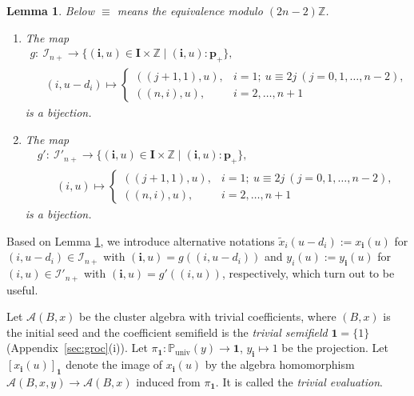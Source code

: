\documentclass[pdftex]{sigma}
\numberwithin{equation}{section}
\newtheorem{Lemma}[Theorem]{Lemma}
\theoremstyle{definition}
\begin{document}
\begin{Lemma}
\label{lem:gmap}
Below $\equiv$ means the equivalence modulo $(2n-2)\mathbb{Z}$.

\begin{enumerate}\itemsep=0pt
\item[$(i)$]
The map
\begin{gather*}
g:  \ \mathcal{I}_{n+} \rightarrow
\{ (\mathbf{i},u)\in \mathbf{I}\times \mathbb{Z} \mid
(\mathbf{i},u): \mathbf{p}_+
\}, \\
\phantom{g: \ } \ (i,u-d_i) \mapsto
\begin{cases}
((j+1,1),u), & i= 1; \
u \equiv 2j
\ (j=0,1,\dots,n-2),\\
((n,i),u), & i=2,\dots,n+1
\end{cases}
\end{gather*}
is a bijection.

\item[$(ii)$]
The map
\begin{gather*}
g': \  \mathcal{I}'_{n+} \rightarrow
\{ (\mathbf{i},u)\in \mathbf{I}\times \mathbb{Z} \mid
 (\mathbf{i},u): \mathbf{p}_+
\}, \\
\phantom{g': \ }{} \  (i,u) \mapsto
\begin{cases}
((j+1,1),u), & i= 1;\
u\equiv 2j
\ (j=0,1,\dots,n-2), \\
((n,i),u), &  i=2,\dots,n+1
\end{cases}
\end{gather*}
is a bijection.
\end{enumerate}
\end{Lemma}

Based on Lemma \ref{lem:gmap},
we introduce alternative notations
$\tilde{x}_i(u-d_i):=x_{\mathbf{i}}(u)$
for $(i,u-d_i)\in \mathcal{I}_{n+}$
with $(\mathbf{i},u)=g((i,u-d_i))$
and
$y_i(u):=y_{\mathbf{i}}(u)$
for $(i,u)\in \mathcal{I}'_{n+}$
with $(\mathbf{i},u)=g'((i,u))$,
respectively,
which turn out to be useful.

 Let $\mathcal{A}(B,x)$ be the cluster algebra
with trivial coef\/f\/icients, where $(B,x)$ is
the initial seed
and the coef\/f\/icient semif\/ield
is the {\em trivial semifield\/}
 $\mathbf{1}=\{1\}$ (Appendix~\ref{sec:groc}(i)).
Let $\pi_{\mathbf{1}}:
\mathbb{P}_{\mathrm{univ}}(y)\rightarrow
\mathbf{1}$, $y_{\mathbf{i}}\mapsto 1$ be the projection.
Let $[x_{\mathbf{i}}(u)]_{\mathbf{1}}$
denote the image of $x_{\mathbf{i}}(u)$
 by the algebra homomorphism
$\mathcal{A}(B,x,y)\rightarrow \mathcal{A}(B,x)$
 induced from $\pi_{\mathbf{1}}$.
It is called the {\em trivial evaluation}.
\end{document}

